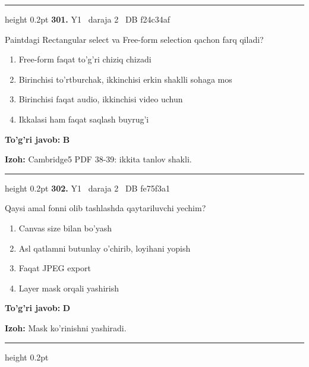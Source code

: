 \documentclass[10pt,a4paper,oneside]{article}
\begin{document}
\vspace{2mm}\hrule height 0.2pt \vspace{4mm}
\hypertarget{q301}{\textbf{\color{ink}301.}}  {\color{muted}\scriptsize Y1 \textbullet\ daraja 2 \textbullet\ DB f24c34af}
\par
Paintdagi Rectangular select va Free-form selection qachon farq qiladi?
\begin{enumerate}[label=\Alph*),leftmargin=9mm]
\item Free-form faqat to'g'ri chiziq chizadi
\item Birinchisi to'rtburchak, ikkinchisi erkin shaklli sohaga mos
\item Birinchisi faqat audio, ikkinchisi video uchun
\item Ikkalasi ham faqat saqlash buyrug'i
\end{enumerate}
\begin{tcolorbox}[enhanced,breakable,colback=teal!4,colframe=teal!45!black,boxrule=0.45pt,arc=1.2mm,left=2.8mm,right=2.8mm,top=2mm,bottom=2mm,before skip=2mm,after skip=2mm]
\textbf{\color{teal}To'g'ri javob:} \textbf{B}
\par\smallskip
\textbf{Izoh:} Cambridge5 PDF 38-39: ikkita tanlov shakli.
\end{tcolorbox}
\vspace{2mm}\hrule height 0.2pt \vspace{4mm}
\hypertarget{q302}{\textbf{\color{ink}302.}}  {\color{muted}\scriptsize Y1 \textbullet\ daraja 2 \textbullet\ DB fe75f3a1}
\par
Qaysi amal fonni olib tashlashda qaytariluvchi yechim?
\begin{enumerate}[label=\Alph*),leftmargin=9mm]
\item Canvas size bilan bo'yash
\item Asl qatlamni butunlay o'chirib, loyihani yopish
\item Faqat JPEG export
\item Layer mask orqali yashirish
\end{enumerate}
\begin{tcolorbox}[enhanced,breakable,colback=teal!4,colframe=teal!45!black,boxrule=0.45pt,arc=1.2mm,left=2.8mm,right=2.8mm,top=2mm,bottom=2mm,before skip=2mm,after skip=2mm]
\textbf{\color{teal}To'g'ri javob:} \textbf{D}
\par\smallskip
\textbf{Izoh:} Mask ko'rinishni yashiradi.
\end{tcolorbox}
\vspace{2mm}\hrule height 0.2pt \vspace{4mm}
\end{document}
